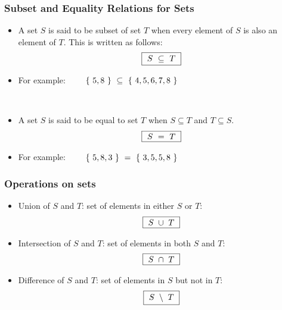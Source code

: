 \documentclass{beamer}
\begin{document}
\begin{frame}


\frametitle{Subset and Equality Relations for Sets}

\begin{itemize}
\item A set $S$ is said to be \alert{subset} of set $T$ when every element of $S$ is also an element of $T$.  This is written as follows:
\begin{eqnarray*}
\fbox{~$
    S  ~\subseteq~ T
~$}
\end{eqnarray*}
\item For example:~~~~
$
\{~5,8~\} ~\subseteq~ \{~4,5,6,7,8~\}
$
\end{itemize}

~

\begin{itemize}
\item A set $S$ is said to be equal to set $T$ when $S\subseteq T$ and $T\subseteq S$.
\begin{eqnarray*}
\fbox{~$
    S  ~=~ T
~$}
\end{eqnarray*}
\item For example:~~~~
$
\{~5,8,3~\} ~=~ \{~3,5,5,8~\}
$
\end{itemize}

\end{frame}



\begin{frame}


\frametitle{Operations on sets}

\begin{itemize}
\item   \alert{Union} of $S$ and $T$: set of elements \alert{in either} $S$ \alert{or} $T$:
\begin{eqnarray*}
\fbox{~$
    S  ~\cup~ T
~$}
\end{eqnarray*}
\item   \alert{Intersection} of $S$ and $T$: set of elements \alert{in both} $S$ \alert{and} $T$:
\begin{eqnarray*}
\fbox{~$
    S  ~\cap~ T
~$}
\end{eqnarray*}
\item   \alert{Difference} of $S$ and $T$:  set of elements \alert{in}  $S$ \alert{but not in}  $T$:
\begin{eqnarray*}
\fbox{~$
    S  ~\setminus~ T
~$}
\end{eqnarray*}\end{itemize}




\end{frame}
\end{document}
